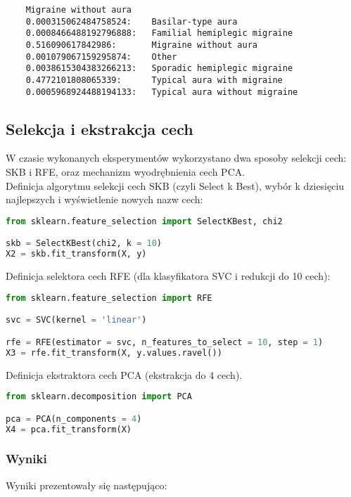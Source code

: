 \begin{verbatim}
    Migraine without aura
    0.000315062484758524:    Basilar-type aura
    0.0008466488192796888:   Familial hemiplegic migraine
    0.516090617842986:       Migraine without aura
    0.001079067159295874:    Other
    0.0038615304383266213:   Sporadic hemiplegic migraine
    0.4772101808065339:      Typical aura with migraine
    0.0005968924488194133:   Typical aura without migraine
\end{verbatim}

\subsection{Selekcja i ekstrakcja cech}
W czasie wykonanych eksperymentów wykorzystano dwa sposoby selekcji cech: SKB i RFE, oraz mechanizm wyodrębnienia cech PCA.\\

Definicja algorytmu selekcji cech SKB (czyli Select k Best), wybór k dziesięciu najlepszych i wyświetlenie nowych nazw cech:
\begin{lstlisting}[language=Python, caption=Definicja selektora SKB]
from sklearn.feature_selection import SelectKBest, chi2

skb = SelectKBest(chi2, k = 10)
X2 = skb.fit_transform(X, y)
\end{lstlisting}

Definicja selektora cech RFE (dla klasyfikatora SVC i redukcji do 10 cech):

\begin{lstlisting}[language=Python, caption=Definicja selektora RFE]
from sklearn.feature_selection import RFE

svc = SVC(kernel = 'linear')

rfe = RFE(estimator = svc, n_features_to_select = 10, step = 1)
X3 = rfe.fit_transform(X, y.values.ravel())
\end{lstlisting}

Definicja ekstraktora cech PCA (ekstrakcja do 4 cech).

\begin{lstlisting}[language=Python, caption=Definicja ekstraktora cech PCA]
from sklearn.decomposition import PCA

pca = PCA(n_components = 4)
X4 = pca.fit_transform(X)
\end{lstlisting}

\subsubsection{Wyniki}
Wyniki prezentowały się następująco:

